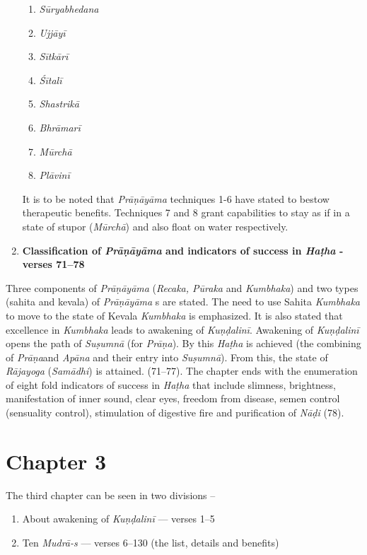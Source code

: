 \begin{enumerate}
\begin{enumerate}
\item \textit{Sūryabhedana}
\item \textit{Ujjāyī}
\item \textit{Sītkārī}
\item \textit{Śītalī}
\item \textit{Shastrikā}
\item \textit{Bhrāmarī}
\item \textit{Mūrchā}
\item \textit{Plāvinī}
\end{enumerate}

It is to be noted that \textit{Prāṇāyāma} techniques 1-6 have stated to bestow therapeutic benefits. Techniques 7 and 8 grant capabilities to stay as if in a state of stupor (\textit{Mūrchā}) and also float on water respectively.

\item \textbf{Classification of \textit{Prāṇāyāma} and indicators of success in \textit{Haṭha} - verses 71--78}
\end{enumerate}

Three components of \textit{Prāṇāyāma} (\textit{Recaka, Pūraka} and \textit{Kumbhaka}) and two types (sahita and kevala) of \textit{Prāṇāyāma} s are stated. The need to use Sahita \textit{Kumbhaka} to move to the state of Kevala \textit{Kumbhaka} is emphasized. It is also stated that excellence in \textit{Kumbhaka} leads to awakening of \textit{Kuṇḍalinī}. Awakening of \textit{Kuṇḍalinī}  opens the path of \textit{Suṣumnā} (for \textit{Prāṇa}). By this \textit{Haṭha} is achieved (the combining of \textit{Prāṇa}and \textit{Apāna} and their entry into \textit{Suṣumnā}).  From this, the state of \textit{Rājayoga} (\textit{Samādhi}) is attained. (71--77). The chapter ends with the  enumeration of eight fold indicators of success in \textit{Haṭha} that include slimness, brightness, manifestation of inner sound, clear eyes, freedom from disease, semen control (sensuality control), stimulation of digestive fire and purification of \textit{Nāḍi} (78). 

\section*{Chapter 3}

The third chapter can be seen in two divisions –

\begin{enumerate}
\item About awakening of \textit{Kuṇḍalinī}  --- verses 1--5
\item Ten \textit{Mudrā-s} --- verses 6--130 (the list, details and benefits)
\end{enumerate}

